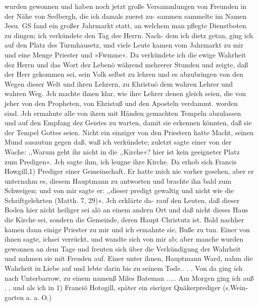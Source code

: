 wurden gewonnen und haben noch jetzt große Versammlungen von
Freunden in der Nähe von Sedbergh, die ich damals zuerst zu-
sammen sammelte im Namen Jesu.
GS fand ein großer Jahrmarkt statt, an welchem man pflegte
Dienstboten zu dingen; ich verkündete den Tag dee Herrn. Nach-
dem ich dietz getan, ging ich auf den Platz des Turmhausetz, und
viele Leute kamen vom Jahrmarkt zu mir und eine Menge Priester
und »Fwmme«. Da verkündete ich die ewige Wahrheit dez
Herrn und das Wort dez Lebenö während mehrerer Stunden
und zeigte, daß der Herr gekommen sei, sein Volk selbst zu lehren
und es abzubringen von den Wegen dieser Welt und ihren Lehrern,
zu Ehristuö dem wahren Lehrer und wahren Weg. Jch machte
ihnen klar, wie ihre Lehrer denen gleich seien, die von jeher
von den Propheten, von Ehristuß und den Aposteln verdammt.
worden sind. Jch ermahnte alle von ihren mit Händen gemachten
Tempeln abzulassen und auf den Empfang dez Geistes zu warten,
damit sie erkennen könnten, daß sie der Tempel Gottes seien.
Nicht ein einziger von den Priestern hatte Macht, seinen Mund
auszutun gegen daß, waß ich verkündete; zuletzt sagte einer von
der Wache: ,,Warum geht ihr nicht in die ,,Kirche«? hier ist
kein geeigneter Platz zum Predigen«. Jch sagte ihm, ich leugne
ihre Kirche. Da erhob sich Francis Howgill,1) Prediger einer
Gemeinschaft. Er hatte mich nie vorher gesehen, aber er unternahm
es, diesem Hauptmann zu antworten und brachte ihn bald zum
Schweigen; und von mir sagte er: ,,dieser predigt gewaltig und
nicht wie die Schriftgelehrten (Matth. 7, 29)«. Jch erklärte da-
rauf den Leuten, daß dieser Boden hier nicht heiliger sei alö an
einem andern Ort und daß nicht dieses Haus die Kirche sei,
sondern die Gemeinde, deren Haupt Christutz ist. Bald nachher
kamen dann einige Priester zu mir und ich ermahnte sie, Buße zu
tun. Einer von ihnen sagte, ichsei verrückt, und wandte sich von
mir ab; aber manche wurden gewonnen an dem Tage und freuten
sich über die Verkündigung der Wahrheit und nahmen sie mit
Freuden auf. Einer unter ihnen, Hauptmann Ward, nahm die
Wahrheit in Liebe auf und lebte darin bis zu seinem Tode.. . .
Von da ging ich nach Unterbarrow, zu einem namenß Miles
Bateman ..... Am Morgen ging ich auß . . und als ich in
1) Franeiö Hotogill, später ein eisriger Qnäkerprediger (s.Wein-
garten a. a. O.)


